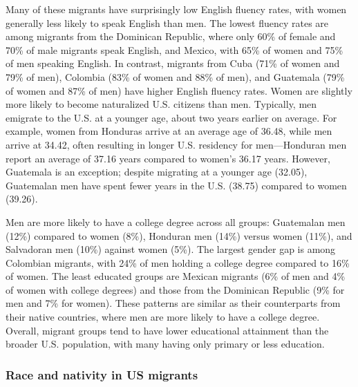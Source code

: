 \documentclass[
]{article}
\begin{document}
Many of these migrants have surprisingly low English fluency rates, with
women generally less likely to speak English than men. The lowest
fluency rates are among migrants from the Dominican Republic, where only
60\% of female and 70\% of male migrants speak English, and Mexico, with
65\% of women and 75\% of men speaking English. In contrast, migrants
from Cuba (71\% of women and 79\% of men), Colombia (83\% of women and
88\% of men), and Guatemala (79\% of women and 87\% of men) have higher
English fluency rates. Women are slightly more likely to become
naturalized U.S. citizens than men. Typically, men emigrate to the U.S.
at a younger age, about two years earlier on average. For example, women
from Honduras arrive at an average age of 36.48, while men arrive at
34.42, often resulting in longer U.S. residency for men---Honduran men
report an average of 37.16 years compared to women's 36.17 years.
However, Guatemala is an exception; despite migrating at a younger age
(32.05), Guatemalan men have spent fewer years in the U.S. (38.75)
compared to women (39.26).

Men are more likely to have a college degree across all groups:
Guatemalan men (12\%) compared to women (8\%), Honduran men (14\%)
versus women (11\%), and Salvadoran men (10\%) against women (5\%). The
largest gender gap is among Colombian migrants, with 24\% of men holding
a college degree compared to 16\% of women. The least educated groups
are Mexican migrants (6\% of men and 4\% of women with college degrees)
and those from the Dominican Republic (9\% for men and 7\% for women).
These patterns are similar as their counterparts from their native
countries, where men are more likely to have a college degree. Overall,
migrant groups tend to have lower educational attainment than the
broader U.S. population, with many having only primary or less
education.

\subsubsection{Race and nativity in US
migrants}\label{race-and-nativity-in-us-migrants}
\end{document}
